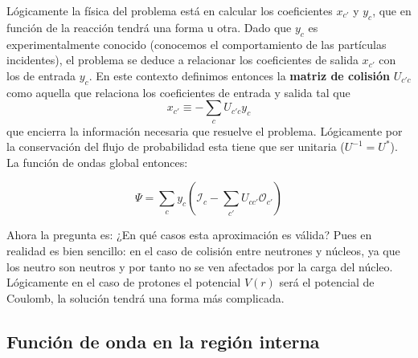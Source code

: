 \documentclass[fleqn,10pt]{SelfArx} %
\newcommand{\parentesis}[1]{\left( #1  \right)}
\newcommand{\Ical}{\mathcal{I}}
\newcommand{\Ocal}{\mathcal{O}}
\begin{document}
Lógicamente la física del problema está en calcular los coeficientes $x_{c'}$ y $y_c$, que en función de la reacción tendrá una forma u otra. Dado que $y_c$ es experimentalmente conocido (conocemos el comportamiento de las partículas incidentes), el problema se deduce a relacionar los coeficientes de salida $x_{c'}$ con los de entrada $y_c$. En este contexto definimos entonces la \textbf{matriz de colisión} $U_{c'c}$ como aquella  que relaciona los coeficientes de entrada y salida tal que
\begin{equation}
	x_{c'} \equiv - \sum_{c} U_{c'c} y_c
\end{equation}
que encierra la información necesaria que resuelve el problema. Lógicamente por la conservación del flujo de probabilidad esta tiene que ser unitaria ($U^{-1}=U^*$). La función de ondas global entonces:

\begin{equation}
	\Psi = \sum_c y_c \parentesis{\Ical_c - \sum_{c'} U_{cc'}\Ocal_{c'}}
\end{equation}

Ahora la pregunta es: ¿En qué casos esta aproximación es válida? Pues en realidad es bien sencillo: en el caso de colisión entre neutrones y núcleos, ya que los neutro son neutros y por tanto no se ven afectados por la carga del núcleo. Lógicamente en el caso de protones el potencial $V(r)$ será el potencial de Coulomb, la solución tendrá una forma más complicada.

\subsection{Función de onda en la región interna}
\end{document}
